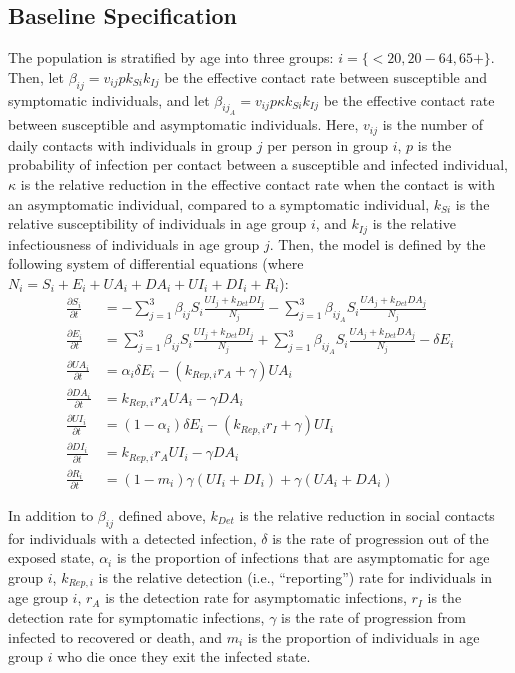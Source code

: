 \documentclass[12pt]{article}
\begin{document}
\subsection{Baseline Specification}

The population is stratified by age into three groups: $i = \{< 20, 20-64, 65+\}$. Then, let \(\beta_{ij}=v_{ij} p k_{Si}k_{Ij}\) be the effective contact rate between susceptible and symptomatic individuals, and let \(\beta_{ij_A}=v_{ij}p\kappa k_{Si}k_{Ij}\) be the effective contact rate between susceptible and asymptomatic individuals. Here, \(v_{ij}\) is the number of daily contacts with individuals in group \(j\) per person in group \(i\), \(p\) is the probability of infection per contact between a susceptible and infected individual, \(\kappa\) is the relative reduction in the effective contact rate when the contact is with an asymptomatic individual, compared to a symptomatic individual, \(k_{Si}\) is the relative susceptibility of individuals in age group \(i\), and \(k_{Ij}\) is the relative infectiousness of individuals in age group \(j\). Then, the model is defined by the following system of differential equations (where \(N_i = S_i + E_i + UA_i + DA_i + UI_i + DI_i + R_i\)):
\begin{align*}
\frac{\partial S_i}{\partial t} &= -\sum_{j=1}^3 \beta_{ij} S_i \frac{UI_j+k_{Det}DI_j}{N_j} - \sum_{j=1}^3 \beta_{ij_A} S_i \frac{UA_j+k_{Det}DA_j}{N_j} \\
\frac{\partial E_i}{\partial t} &= \sum_{j=1}^3 \beta_{ij} S_i \frac{UI_j+k_{Det}DI_j}{N_j} + \sum_{j=1}^3 \beta_{ij_A} S_i \frac{UA_j+k_{Det}DA_j}{N_j}- \delta E_i \\
\frac{\partial UA_i}{\partial t} &= \alpha_i\delta E_i  - (k_{Rep,i}r_A+\gamma) UA_i \\
\frac{\partial DA_i}{\partial t} &= k_{Rep,i}r_A UA_i - \gamma DA_i \\
\frac{\partial UI_i}{\partial t} &= (1-\alpha_i)\delta E_i - (k_{Rep,i}r_I + \gamma)  UI_i\\
\frac{\partial DI_i}{\partial t} &= k_{Rep,i}r_A UI_i - \gamma DA_i\\
\frac{\partial R_i}{\partial t} &= (1-m_i)\gamma (UI_i + DI_i) + \gamma (UA_i + DA_i)
\end{align*}

In addition to \(\beta_{ij}\) defined above, \(k_{Det}\) is the relative reduction in social contacts for individuals with a detected infection, \(\delta\) is the rate of progression out of the exposed state, \(\alpha_i\) is the proportion of infections that are asymptomatic for age group \(i\), \(k_{Rep,i}\) is the relative detection (i.e., ``reporting'') rate for individuals in age group \(i\), \(r_A\) is the detection rate for asymptomatic infections, \(r_I\) is the detection rate for symptomatic infections, \(\gamma\) is the rate of progression from infected to recovered or death, and \(m_i\) is the proportion of individuals in age group \(i\) who die once they exit the infected state.
\end{document}
